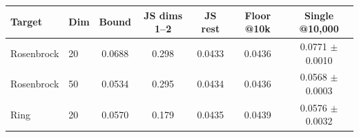 \begin{tabular}{llccccc}
\toprule
Target & Dim & Bound & JS dims 1--2 & JS rest & Floor @10k & Single @10{,}000 \\
\midrule
Rosenbrock & 20 & 0.0688 & 0.298 & 0.0433 & 0.0436 & 0.0771 $\pm$ 0.0010 \\
Rosenbrock & 50 & 0.0534 & 0.295 & 0.0434 & 0.0436 & 0.0568 $\pm$ 0.0003 \\
Ring & 20 & 0.0570 & 0.179 & 0.0435 & 0.0439 & 0.0576 $\pm$ 0.0032 \\
\bottomrule
\end{tabular}
